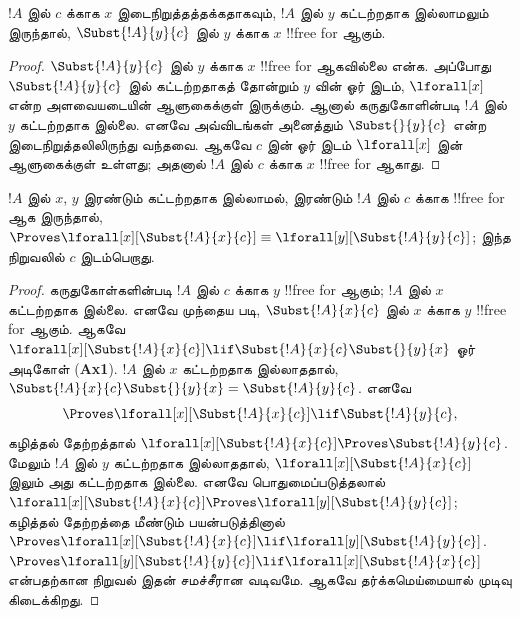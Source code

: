 \documentclass[../../../include/open-logic-section]{subfiles}
\begin{document}
\begin{lem}
$!A$ இல் $c$ க்காக $x$ இடைநிறுத்தத்தக்கதாகவும், $!A$ இல் $y$
கட்டற்றதாக இல்லாமலும் இருந்தால், $\Subst{!A}{y}{c}$ இல் $y$ க்காக $x$
!!{free for} ஆகும்.
\end{lem}

\begin{proof}
$\Subst{!A}{y}{c}$ இல் $y$ க்காக $x$ !!{free for} ஆகவில்லை என்க.
அப்போது $\Subst{!A}{y}{c}$ இல் கட்டற்றதாகத் தோன்றும் $y$ வின் ஓர்
இடம், $\lforall[x]$ என்ற அளவையடையின் ஆளுகைக்குள் இருக்கும். ஆனால்
கருதுகோளின்படி $!A$ இல் $y$ கட்டற்றதாக இல்லை. எனவே அவ்விடங்கள் அனைத்தும்
$\Subst{}{y}{c}$ என்ற இடைநிறுத்தலிலிருந்து வந்தவை. ஆகவே $c$ இன் ஓர்
இடம் $\lforall[x]$ இன் ஆளுகைக்குள் உள்ளது; அதனால் $!A$ இல் $c$
க்காக $x$ !!{free for} ஆகாது.
\end{proof}

\begin{lem}[கட்டுண்ட மாறியை மாற்றுதல்]
$!A$ இல் $x$, $y$ இரண்டும் கட்டற்றதாக இல்லாமல், இரண்டும் $!A$ இல் $c$
க்காக !!{free for} ஆக இருந்தால்,
$\Proves \lforall[x][\Subst{!A}{x}{c}] \equiv
\lforall[y][\Subst{!A}{y}{c}]$; இந்த நிறுவலில் $c$ இடம்பெறாது.
\end{lem}

\begin{proof}
கருதுகோள்களின்படி $!A$ இல் $c$ க்காக $y$ !!{free for} ஆகும்;
$!A$ இல் $x$ கட்டற்றதாக இல்லை. எனவே முந்தைய
 படி, $\Subst{!A}{x}{c}$ இல் $x$ க்காக $y$
!!{free for} ஆகும். ஆகவே
$\lforall[x][\Subst{!A}{x}{c}] \lif \Subst{!A}{x}{c} \Subst{}{y}{x}$
ஓர் அடிகோள் (\textbf{Ax1}). $!A$ இல் $x$ கட்டற்றதாக இல்லாததால்,
$\Subst{!A}{x}{c} \Subst{}{y}{x} = \Subst{!A}{y}{c}$. எனவே
\[
\Proves \lforall[x][\Subst{!A}{x}{c}] \lif \Subst{!A}{y}{c},
\]
கழித்தல் தேற்றத்தால் $\lforall[x][\Subst{!A}{x}{c}] \Proves
\Subst{!A}{y}{c}$. மேலும் $!A$ இல் $y$ கட்டற்றதாக இல்லாததால்,
$\lforall[x][\Subst{!A}{x}{c}]$ இலும் அது கட்டற்றதாக இல்லை. எனவே
பொதுமைப்படுத்தலால்
$\lforall[x][\Subst{!A}{x}{c}] \Proves
\lforall[y][\Subst{!A}{y}{c}]$; கழித்தல் தேற்றத்தை மீண்டும்
பயன்படுத்தினால் $\Proves
\lforall[x][\Subst{!A}{x}{c}] \lif \lforall[y][\Subst{!A}{y}{c}]$.
$\Proves \lforall[y][\Subst{!A}{y}{c}] \lif \lforall[x]
[\Subst{!A}{x}{c}]$ என்பதற்கான நிறுவல் இதன் சமச்சீரான வடிவமே.
ஆகவே தர்க்கமெய்மையால் முடிவு கிடைக்கிறது.
\end{proof}
\end{document}
